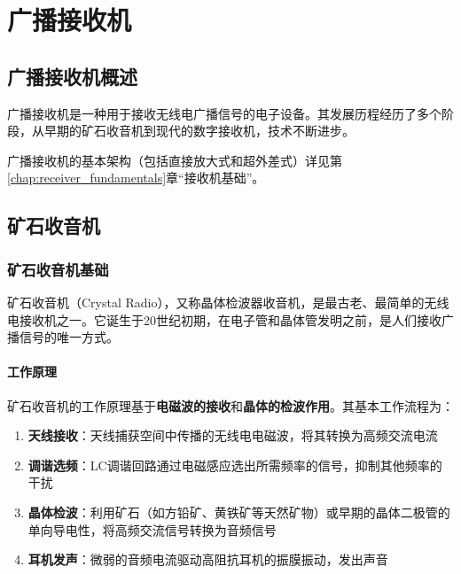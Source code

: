 \chapter{广播接收机}
\label{chap:broadcast_receiver}

\section{广播接收机概述}
\label{sec:broadcast_receiver_intro}

广播接收机是一种用于接收无线电广播信号的电子设备。其发展历程经历了多个阶段，从早期的矿石收音机到现代的数字接收机，技术不断进步。

广播接收机的基本架构（包括直接放大式和超外差式）详见第\ref{chap:receiver_fundamentals}章“接收机基础”。

\section{矿石收音机}
\label{sec:crystal_radio}

\subsection{矿石收音机基础}
\label{sec:crystal_radio_fundamentals}

矿石收音机（Crystal Radio），又称晶体检波器收音机，是最古老、最简单的无线电接收机之一。它诞生于20世纪初期，在电子管和晶体管发明之前，是人们接收广播信号的唯一方式。

\subsubsection{工作原理}
\label{sec:crystal_radio_working_principle}

矿石收音机的工作原理基于\textbf{电磁波的接收}和\textbf{晶体的检波作用}。其基本工作流程为：

\begin{enumerate}
    \item \textbf{天线接收}：天线捕获空间中传播的无线电电磁波，将其转换为高频交流电流
    \item \textbf{调谐选频}：LC调谐回路通过电磁感应选出所需频率的信号，抑制其他频率的干扰
    \item \textbf{晶体检波}：利用矿石（如方铅矿、黄铁矿等天然矿物）或早期的晶体二极管的单向导电性，将高频交流信号转换为音频信号
    \item \textbf{耳机发声}：微弱的音频电流驱动高阻抗耳机的振膜振动，发出声音
\end{enumerate}

